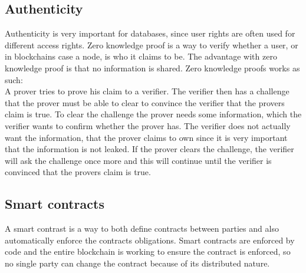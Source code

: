 \subsection{Authenticity}
Authenticity is very important for databases, since user rights are often used for different access rights. Zero knowledge proof is a way to verify whether a user, or in blockchains case a node, is who it claims to be. The advantage with zero knowledge proof is that no information is shared. Zero knowledge proofs works as such:\\
A prover tries to prove his claim to a verifier. The verifier then has a challenge that the prover must be able to clear to convince the verifier that the provers claim is true. To clear the challenge the prover needs some information, which the verifier wants to confirm whether the prover has. The verifier does not actually want the information, that the prover claims to own since it is very important that the information is not leaked. If the prover clears the challenge, the verifier will ask the challenge once more and this will continue until the verifier is convinced that the provers claim is true.\cite{art:zero_knowledge_proofs}




\subsection{Smart contracts}
A smart contrast is a way to both define contracts between parties and also automatically enforce the contracts obligations. Smart contracts are enforced by code and the entire blockchain is working to ensure the contract is enforced, so no single party can change the contract because of its distributed nature\cite{website:blockchaintechnologies}.